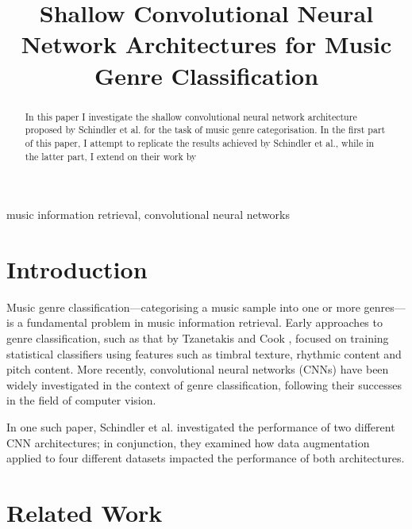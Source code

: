 \documentclass[conference]{IEEEtran}
\begin{document}
\title{Shallow Convolutional Neural Network Architectures for Music Genre Classification}

\author{
}

\maketitle

\begin{abstract}
In this paper I investigate the shallow convolutional neural network architecture proposed by Schindler et al. \cite{SchindlerLidyRauber} for the task of music genre categorisation.
In the first part of this paper, I attempt to replicate the results achieved by Schindler et al., while in the latter part, I extend on their work by 
\end{abstract}

\begin{IEEEkeywords}
music information retrieval, convolutional neural networks
\end{IEEEkeywords}

\section{Introduction}

Music genre classification---categorising a music sample into one or more genres---is a fundamental problem in music information retrieval.
Early approaches to genre classification, such as that by Tzanetakis and Cook \cite{TzanetakisCook}, focused on training statistical classifiers using features such as timbral texture, rhythmic content and pitch content.
More recently, convolutional neural networks (CNNs) have been widely investigated in the context of genre classification, following their successes in the field of computer vision.

In one such paper, Schindler et al. \cite{SchindlerLidyRauber} investigated the performance of two different CNN architectures; in conjunction, they examined how data augmentation applied to four different datasets impacted the performance of both architectures.

\section{Related Work}
\end{document}
